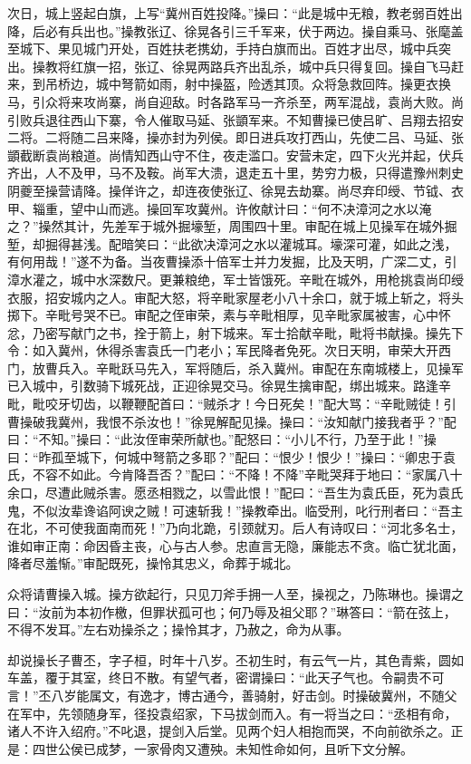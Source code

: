 次日，城上竖起白旗，上写“冀州百姓投降。”操曰：“此是城中无粮，教老弱百姓出降，后必有兵出也。”操教张辽、徐晃各引三千军来，伏于两边。操自乘马、张麾盖至城下、果见城门开处，百姓扶老携幼，手持白旗而出。百姓才出尽，城中兵突出。操教将红旗一招，张辽、徐晃两路兵齐出乱杀，城中兵只得复回。操自飞马赶来，到吊桥边，城中弩箭如雨，射中操盔，险透其顶。众将急救回阵。操更衣换马，引众将来攻尚寨，尚自迎敌。时各路军马一齐杀至，两军混战，袁尚大败。尚引败兵退往西山下寨，令人催取马延、张顗军来。不知曹操已使吕旷、吕翔去招安二将。二将随二吕来降，操亦封为列侯。即日进兵攻打西山，先使二吕、马延、张顗截断袁尚粮道。尚情知西山守不住，夜走滥口。安营未定，四下火光并起，伏兵齐出，人不及甲，马不及鞍。尚军大溃，退走五十里，势穷力极，只得遣豫州刺史阴夔至操营请降。操佯许之，却连夜使张辽、徐晃去劫寨。尚尽弃印绶、节钺、衣甲、辎重，望中山而逃。操回军攻冀州。许攸献计曰：“何不决漳河之水以淹之？”操然其计，先差军于城外掘壕堑，周围四十里。审配在城上见操军在城外掘堑，却掘得甚浅。配暗笑曰：“此欲决漳河之水以灌城耳。壕深可灌，如此之浅，有何用哉！”遂不为备。当夜曹操添十倍军士并力发掘，比及天明，广深二丈，引漳水灌之，城中水深数尺。更兼粮绝，军士皆饿死。辛毗在城外，用枪挑袁尚印绶衣服，招安城内之人。审配大怒，将辛毗家屋老小八十余口，就于城上斩之，将头掷下。辛毗号哭不已。审配之侄审荣，素与辛毗相厚，见辛毗家属被害，心中怀忿，乃密写献门之书，拴于箭上，射下城来。军士拾献辛毗，毗将书献操。操先下令：如入冀州，休得杀害袁氏一门老小；军民降者免死。次日天明，审荣大开西门，放曹兵入。辛毗跃马先入，军将随后，杀入冀州。审配在东南城楼上，见操军已入城中，引数骑下城死战，正迎徐晃交马。徐晃生擒审配，绑出城来。路逢辛毗，毗咬牙切齿，以鞭鞭配首曰：“贼杀才！今日死矣！”配大骂：“辛毗贼徒！引曹操破我冀州，我恨不杀汝也！”徐晃解配见操。操曰：“汝知献门接我者乎？”配曰：“不知。”操曰：“此汝侄审荣所献也。”配怒曰：“小儿不行，乃至于此！”操曰：“昨孤至城下，何城中弩箭之多耶？”配曰：“恨少！恨少！”操曰：“卿忠于袁氏，不容不如此。今肯降吾否？”配曰：“不降！不降”辛毗哭拜于地曰：“家属八十余口，尽遭此贼杀害。愿丞相戮之，以雪此恨！”配曰：“吾生为袁氏臣，死为袁氏鬼，不似汝辈谗谄阿谀之贼！可速斩我！”操教牵出。临受刑，叱行刑者曰：“吾主在北，不可使我面南而死！”乃向北跪，引颈就刃。后人有诗叹曰：“河北多名士，谁如审正南：命因昏主丧，心与古人参。忠直言无隐，廉能志不贪。临亡犹北面，降者尽羞惭。”审配既死，操怜其忠义，命葬于城北。

众将请曹操入城。操方欲起行，只见刀斧手拥一人至，操视之，乃陈琳也。操谓之曰：“汝前为本初作檄，但罪状孤可也；何乃辱及祖父耶？”琳答曰：“箭在弦上，不得不发耳。”左右劝操杀之；操怜其才，乃赦之，命为从事。

却说操长子曹丕，字子桓，时年十八岁。丕初生时，有云气一片，其色青紫，圆如车盖，覆于其室，终日不散。有望气者，密谓操曰：“此天子气也。令嗣贵不可言！”丕八岁能属文，有逸才，博古通今，善骑射，好击剑。时操破冀州，不随父在军中，先领随身军，径投袁绍家，下马拔剑而入。有一将当之曰：“丞相有命，诸人不许入绍府。”不叱退，提剑入后堂。见两个妇人相抱而哭，不向前欲杀之。正是：四世公侯已成梦，一家骨肉又遭殃。未知性命如何，且听下文分解。